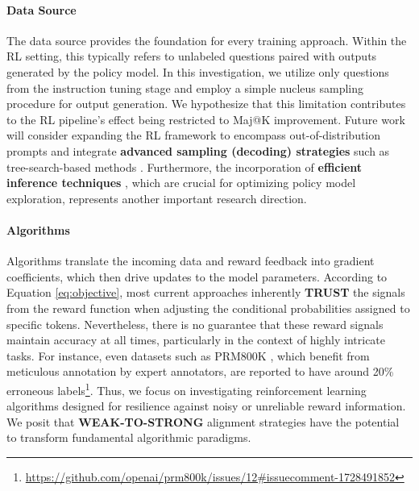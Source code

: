 \paragraph{Data Source} The data source provides the foundation for every training approach. Within the RL setting, this typically refers to unlabeled questions paired with outputs generated by the policy model. In this investigation, we utilize only questions from the instruction tuning stage and employ a simple nucleus sampling procedure for output generation. We hypothesize that this limitation contributes to the RL pipeline's effect being restricted to Maj@K improvement. Future work will consider expanding the RL framework to encompass out-of-distribution prompts and integrate \textbf{advanced sampling (decoding) strategies} such as tree-search-based methods \citep{yao2023tree}. Furthermore, the incorporation of \textbf{efficient inference techniques} \citep{xia-etal-2023-speculative,leviathan2023fast,kwon2023efficient,xia2024unlocking}, which are crucial for optimizing policy model exploration, represents another important research direction.

\paragraph{Algorithms} Algorithms translate the incoming data and reward feedback into gradient coefficients, which then drive updates to the model parameters. According to Equation \ref{eq:objective}, most current approaches inherently \textbf{TRUST} the signals from the reward function when adjusting the conditional probabilities assigned to specific tokens. Nevertheless, there is no guarantee that these reward signals maintain accuracy at all times, particularly in the context of highly intricate tasks. For instance, even datasets such as PRM800K \citep{lightman2023let}, which benefit from meticulous annotation by expert annotators, are reported to have around 20\% erroneous labels\footnote{\url{https://github.com/openai/prm800k/issues/12\#issuecomment-1728491852}}. Thus, we focus on investigating reinforcement learning algorithms designed for resilience against noisy or unreliable reward information. We posit that \textbf{WEAK-TO-STRONG} alignment strategies \citep{burns2023weak} have the potential to transform fundamental algorithmic paradigms.


